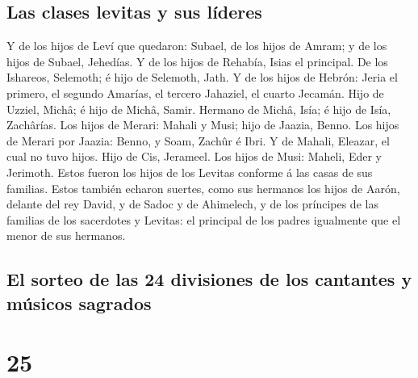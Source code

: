 \hypertarget{las-clases-levitas-y-sus-luxedderes}{%
\subsection{Las clases levitas y sus
líderes}\label{las-clases-levitas-y-sus-luxedderes}}

 Y de los hijos de Leví que quedaron: Subael, de los
hijos de Amram; y de los hijos de Subael, Jehedías.  Y de
los hijos de Rehabía, Isias el principal.  De los
Ishareos, Selemoth; é hijo de Selemoth, Jath.  Y de los
hijos de Hebrón: Jeria el primero, el segundo Amarías, el tercero
Jahaziel, el cuarto Jecamán.  Hijo de Uzziel, Michâ; é
hijo de Michâ, Samir.  Hermano de Michâ, Isía; é hijo de
Isía, Zachârías.  Los hijos de Merari: Mahali y Musi;
hijo de Jaazia, Benno.  Los hijos de Merari por Jaazia:
Benno, y Soam, Zachûr é Ibri.  Y de Mahali, Eleazar, el
cual no tuvo hijos.  Hijo de Cis, Jerameel.
 Los hijos de Musi: Maheli, Eder y Jerimoth. Estos fueron
los hijos de los Levitas conforme á las casas de sus familias.
 Estos también echaron suertes, como sus hermanos los
hijos de Aarón, delante del rey David, y de Sadoc y de Ahimelech, y de
los príncipes de las familias de los sacerdotes y Levitas: el principal
de los padres igualmente que el menor de sus hermanos.

\hypertarget{el-sorteo-de-las-24-divisiones-de-los-cantantes-y-muxfasicos-sagrados}{%
\subsection{El sorteo de las 24 divisiones de los cantantes y músicos
sagrados}\label{el-sorteo-de-las-24-divisiones-de-los-cantantes-y-muxfasicos-sagrados}}

\hypertarget{section-13-25}{%
\section{25}\label{section-13-25}}

